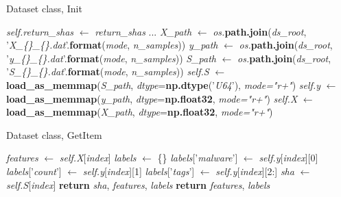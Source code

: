 \documentclass[pdfa%
,cucitura%
]{toptesi}
\begin{document}
\begin{algorithm}[h!]
	\caption{Dataset class, Init}\label{alg:DatasetInit}
	\begin{algorithmic}[1]
			\State \textit{self.return\_shas} $\gets$ \textit{return\_shas}
			\State ...
			\State \textit{X\_path} $\gets$ \textit{os.}\textbf{path.join}(\textit{ds\_root}, '\textit{X\_\{\}\_\{\}.dat}'.\textbf{format}(\textit{mode}, \textit{n\_samples}))
			\State \textit{y\_path} $\gets$ \textit{os.}\textbf{path.join}(\textit{ds\_root},  '\textit{y\_\{\}\_\{\}.dat}'.\textbf{format}(\textit{mode}, \textit{n\_samples}))
			\State \textit{S\_path} $\gets$ \textit{os.}\textbf{path.join}(\textit{ds\_root},  '\textit{S\_\{\}\_\{\}.dat}'.\textbf{format}(\textit{mode}, \textit{n\_samples}))
			\State
			\State \textit{self.S} $\gets$ \textbf{load\_as\_memmap}(\textit{S\_path}, \textit{dtype}=\textbf{np.dtype}('\textit{U64}'), \textit{mode="r+"})
			\State \textit{self.y} $\gets$ \textbf{load\_as\_memmap}(\textit{y\_path}, \textit{dtype}=\textbf{np.float32}, \textit{mode="r+"})
			\State \textit{self.X} $\gets$ \textbf{load\_as\_memmap}(\textit{X\_path}, \textit{dtype}=\textbf{np.float32}, \textit{mode="r+"})		
			\EndFunction
	\end{algorithmic}
\end{algorithm}

\begin{algorithm}[h!]
	\caption{Dataset class, GetItem}\label{alg:DatasetGetItem}
	\begin{algorithmic}[1]
			\State \textit{features} $\gets$ \textit{self.X}[\textit{index}]
			\State
			\State \textit{labels} $\gets$ \{\}
			\State \textit{labels}['\textit{malware}'] $\gets$ \textit{self.y}[\textit{index}][0]
			\State \textit{labels}['\textit{count}'] $\gets$ \textit{self.y}[\textit{index}][1]
			\State \textit{labels}['\textit{tags}'] $\gets$ \textit{self.y}[\textit{index}][2:]
			\State
				\State \textit{sha} $\gets$ \textit{self.S}[\textit{index}]
				\State \textbf{return} \textit{sha}, \textit{features}, \textit{labels}
			\Else
				\State \textbf{return} \textit{features}, \textit{labels}
			\EndIf
			\EndFunction
		\EndClass
	\end{algorithmic}
\end{algorithm}
\end{document}
